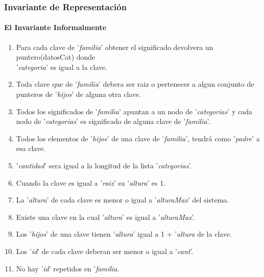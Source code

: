 \subsubsection{Invariante de Representaci\'on}
\paragraph{El Invariante Informalmente}
\begin{enumerate}
\item Para cada clave de '\textit{familia}' obtener el significado devolvera un puntero(datosCat) donde\\ '\textit{categoria}' es igual a la clave.
\item Toda clave que de '\textit{familia}' debera ser raiz o pertenecer a algun conjunto de punteros de '\textit{hijos}' de alguna otra clave.
\item Todos los significados de '\textit{familia}' apuntan a un nodo de '\textit{categorias}' y cada nodo de '\textit{categorias}' es significado de alguna clave de '\textit{familia}'.
\item Todos los elementos de '\textit{hijos}' de una clave de '\textit{familia}', tendrá como '\textit{padre}' a esa clave.
\item '\textit{cantidad}' sera igual a la longitud de la lista '\textit{categorias}'.
\item Cuando la clave es igual a '\textit{raiz}' su '\textit{altura}' es 1.
\item La '\textit{altura}' de cada clave es menor o igual a '\textit{alturaMax}' del sistema.
\item Existe una clave en la cual '\textit{altura}' es igual a '\textit{alturaMax}'.
\item Los '\textit{hijos}' de una clave tienen '\textit{altura}' igual a 1 + '\textit{altura} de la clave.
\item Los '\textit{id}' de cada clave deberan ser menor o igual a '\textit{cant}'.
\item No hay '\textit{id}' repetidos en '\textit{familia}.

\end{enumerate}


